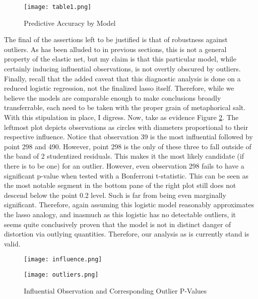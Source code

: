 \documentclass[11pt]{article}
\begin{document}
	\begin{figure}[htbp]
\centerline{\texttt{[image: table1.png]}}
\caption{Predictive Accuracy by Model}\label{fig:coef}
\end{figure}


	The final of the assertions left to be justified is that of robustness against outliers.  As has been alluded to in previous sections, this is not a general property of the elastic net, but my claim is that this particular model, while certainly inducing influential observations, is not overtly obscured by outliers.  Finally, recall that the added caveat that this diagnostic analysis is done on a reduced logistic regression, not the finalized lasso itself.  Therefore, while we believe the models are comparable enough to make conclusions broadly transferrable, each need to be taken with the proper grain of metaphorical salt.  With this stipulation in place, I digress.  Now, take as evidence Figure \ref{fig:out}.  The leftmost plot depicts observations as circles with diameters proportional to their respective influence.  Notice that observation 39 is the most influential followed by point 298 and 490.  However, point 298 is the only of these three to fall outside of the band of 2 studentized residuals.  This makes it the most likely candidate (if there is to be one) for an outlier.  However, even observation 298 fails to have a significant p-value when tested with a Bonferroni t-statistic.  This can be seen as the most notable segment in the bottom pane of the right plot still does not descend below the point 0.2 level.  Such is far from being even marginally significant.   Therefore, again assuming this logistic model reasonably approximates the lasso analogy, and inasmuch as this logistic has no detectable outliers, it seems quite conclusively proven that the model is not in distinct danger of distortion via outlying quantities.  Therefore, our analysis as is currently stand is valid.  
	
	
	
	\begin{figure}[htbp]
\centering
\begin{minipage}{.5\textwidth}
	\centering
	\texttt{[image: influence.png]}
\end{minipage}%
\begin{minipage}{.5\textwidth}
	\centering
	\texttt{[image: outliers.png]}
\end{minipage}%
\caption{Influential Observation and Corresponding Outlier P-Values}\label{fig:out}
\end{figure}
\end{document}
